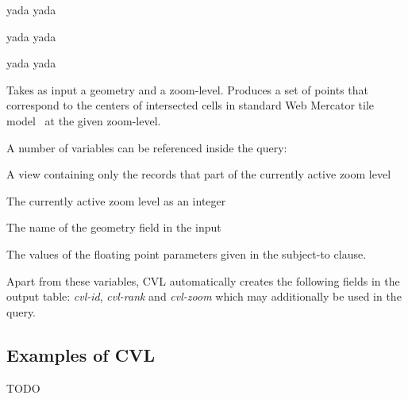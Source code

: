  yada yada

 yada yada

 yada yada

Takes as input a geometry and a zoom-level. Produces a set of points that correspond to the centers of intersected cells in standard Web Mercator tile model~\cite{osm?} at the given zoom-level.

A number of variables can be referenced inside the query:

 A view containing only the records that part of the currently active zoom level

 The currently active zoom level as an integer

 The name of the geometry field in the input

 The values of the floating point parameters given in the subject-to clause.

Apart from these variables, CVL automatically creates the following fields in the output table: \emph{cvl-id}, \emph{cvl-rank} and \emph{cvl-zoom} which may additionally be used in the query.

\subsection{Examples of CVL}

TODO
